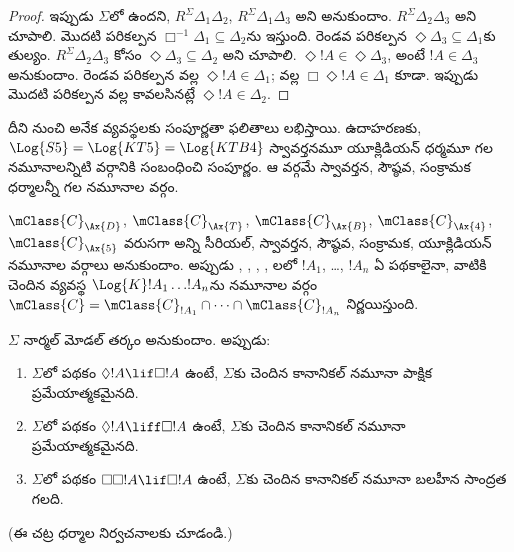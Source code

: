 \documentclass[../../../include/open-logic-section]{subfiles}
\begin{document}
\begin{proof}
  ఇప్పుడు $\Sigma$లో  ఉందని, $R^\Sigma
  \Delta_1\Delta_2$, $R^\Sigma \Delta_1\Delta_3$ అని
  అనుకుందాం. $R^\Sigma \Delta_2\Delta_3$ అని చూపాలి.
  మొదటి పరికల్పన $\Box^{-1}\Delta_1 \subseteq
  \Delta_2$ను ఇస్తుంది. రెండవ
  పరికల్పన $\Diamond\Delta_3 \subseteq
  \Delta_1$కు తుల్యం.
  $R^\Sigma \Delta_2\Delta_3$ కోసం
  $\Diamond\Delta_3 \subseteq \Delta_2$ అని చూపాలి.
  $\Diamond!A \in \Diamond\Delta_3$, అంటే
  $!A \in \Delta_3$ అనుకుందాం. రెండవ పరికల్పన వల్ల
  $\Diamond!A \in \Delta_1$;  వల్ల
  $\Box\Diamond!A \in \Delta_1$ కూడా. ఇప్పుడు మొదటి
  పరికల్పన వల్ల కావలసినట్లే $\Diamond!A \in \Delta_2$.
  \end{proof}

దీని నుంచి అనేక వ్యవస్థలకు సంపూర్ణతా ఫలితాలు లభిస్తాయి. ఉదాహరణకు,
$\Log{S5} = \Log{KT5} = \Log{KTB4}$ స్వావర్తనమూ
యూక్లిడియన్ ధర్మమూ గల నమూనాలన్నిటి వర్గానికి సంబంధించి సంపూర్ణం.
ఆ వర్గమే స్వావర్తన, సౌష్ఠవ, సంక్రామక ధర్మాలన్నీ గల నమూనాల వర్గం.

\begin{thm}
  $\mClass{C}_\Ax{D}$, $\mClass{C}_\Ax{T}$,
  $\mClass{C}_\Ax{B}$, $\mClass{C}_\Ax{4}$,
  $\mClass{C}_\Ax{5}$ వరుసగా అన్ని సీరియల్, స్వావర్తన,
  సౌష్ఠవ, సంక్రామక, యూక్లిడియన్ నమూనాల వర్గాలు
  అనుకుందాం. అప్పుడు , , ,
  , లలో $!A_1$,
  \dots, $!A_n$ ఏ పథకాలైనా, వాటికి చెందిన వ్యవస్థ $\Log{K}!A_1 \dots !A_n$ను
  నమూనాల వర్గం $\mClass{C} = \mClass{C}_{!A_1} \cap
  \dots \cap \mClass{C}_{!A_n}$ నిర్ణయిస్తుంది.
\end{thm}

\begin{prop}
  $\Sigma$ నార్మల్ మోడల్ తర్కం అనుకుందాం. అప్పుడు:
  \begin{enumerate}
  \item{}%
    $\Sigma$లో పథకం $\Diamond!A \lif \Box !A$ ఉంటే,
    $\Sigma$కు చెందిన కానానికల్ నమూనా పాక్షిక ప్రమేయాత్మకమైనది.
  \item $\Sigma$లో పథకం $\Diamond!A \liff \Box !A$
    ఉంటే, $\Sigma$కు చెందిన కానానికల్ నమూనా ప్రమేయాత్మకమైనది.
  \item $\Sigma$లో పథకం $\Box\Box!A \lif \Box !A$
    ఉంటే, $\Sigma$కు చెందిన కానానికల్ నమూనా బలహీన సాంద్రత గలది.
  \end{enumerate}
  (ఈ చట్ర ధర్మాల నిర్వచనాలకు
   చూడండి.)
\end{prop}
\end{document}
